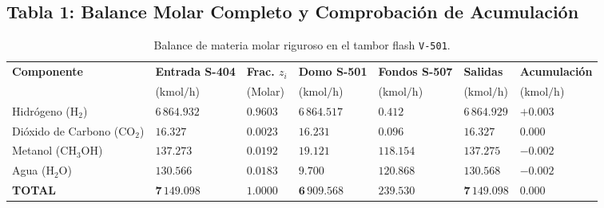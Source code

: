 \documentclass[11pt,letterpaper]{article}
\begin{document}
\subsection{Tabla 1: Balance Molar Completo y Comprobación de Acumulación}
\begin{table}[H]
\centering
\small
\setlength{\tabcolsep}{3pt}
\begin{tabularx}{\textwidth}{>{\raggedright\arraybackslash}p{3.5cm} >{\raggedleft\arraybackslash}X >{\centering\arraybackslash}p{1.6cm} >{\raggedleft\arraybackslash}X >{\raggedleft\arraybackslash}X >{\raggedleft\arraybackslash}X >{\raggedleft\arraybackslash}p{2.3cm}}
\toprule
\textbf{Componente} & \textbf{Entrada S-404} & \textbf{Frac. $z_i$} & \textbf{Domo S-501} & \textbf{Fondos S-507} & \textbf{Salidas} & \textbf{Acumulación} \\
 & ($\text{kmol/h}$) & (Molar) & ($\text{kmol/h}$) & ($\text{kmol/h}$) & ($\text{kmol/h}$) & ($\text{kmol/h}$) \\
\midrule
Hidrógeno ($\text{H}_2$) & $6\,864.932$ & $0.9603$ & $6\,864.517$ & $0.412$ & $6\,864.929$ & $\mathbf{+0.003}$ \\
Dióxido de Carbono ($\text{CO}_2$) & $16.327$ & $0.0023$ & $16.231$ & $0.096$ & $16.327$ & $\mathbf{0.000}$ \\
Metanol ($\text{CH}_3\text{OH}$) & $\mathbf{137.273}$ & $\mathbf{0.0192}$ & $19.121$ & $\mathbf{118.154}$ & $\mathbf{137.275}$ & $\mathbf{-0.002}$ \\
Agua ($\text{H}_2\text{O}$) & $130.566$ & $0.0183$ & $9.700$ & $120.868$ & $130.568$ & $\mathbf{-0.002}$ \\
\midrule
\textbf{TOTAL} & $\mathbf{7\,149.098}$ & $\mathbf{1.0000}$ & $\mathbf{6\,909.568}$ & $\mathbf{239.530}$ & $\mathbf{7\,149.098}$ & $\mathbf{0.000}$ \\
\bottomrule
\end{tabularx}
\caption{Balance de materia molar riguroso en el tambor flash \texttt{V-501}.}
\end{table}

\vspace{-0.1cm}
\end{document}

